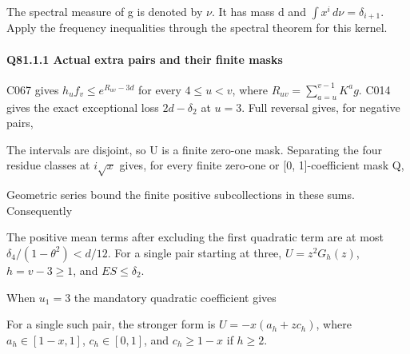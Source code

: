 The spectral measure of g is denoted by \(\nu\). It has mass d and
\(\int x^i\,\allowbreak  d\nu=\delta_{i+1}\). Apply the frequency inequalities through the spectral theorem for this kernel.

\paragraph{Q81.1.1 Actual extra pairs and their finite masks}

C067 gives \(h_u f_v\le e^{R_{uv}-3d}\) for every \(4\le u<v\),
where \(R_{uv}=\sum_{a=u}^{v-1}K^a g\). C014 gives the exact exceptional
loss \(2d-\delta_2\) at \(u=3\). Full reversal gives, for negative pairs,


The intervals are disjoint, so U is a finite zero-one mask. Separating
the four residue classes at \(i\sqrt x\) gives, for every finite
zero-one or [0, 1]-coefficient mask Q,


Geometric series bound the finite positive subcollections in these sums. Consequently


The positive mean terms after excluding the first quadratic term are
at most \(\delta_4/(1-\theta^2)<d/12\). For a single pair starting at three,
\(U=z^2G_h(z)\), \(h=v-3\ge1\), and \(ES\le \delta_2\).

When \(u_{1}=3\) the mandatory quadratic coefficient gives


For a single such pair, the stronger form is
\(U=-x(a_h+z c_h)\), where \(a_h\in[1-x,\allowbreak  1]\),
\(c_h\in[0,\allowbreak  1]\), and \(c_h\ge1-x\) if \(h\ge2\).

